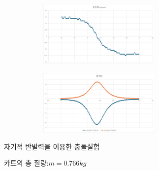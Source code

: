 \documentclass[12pt,a4paper]{article}
\begin{document}
\begin{figure}[h!]
    \centering
    \begin{subfigure}{0.4\textwidth}
        \includegraphics[width=6cm]{W11G6.png}
    \end{subfigure}
    \begin{subfigure}{0.4\textwidth}
        \includegraphics[width=6cm]{W11G7.png}
    \end{subfigure}
\end{figure}
자기적 반발력을 이용한 충돌실험

카트의 총 질량:$m=0.766kg$
\end{document}

